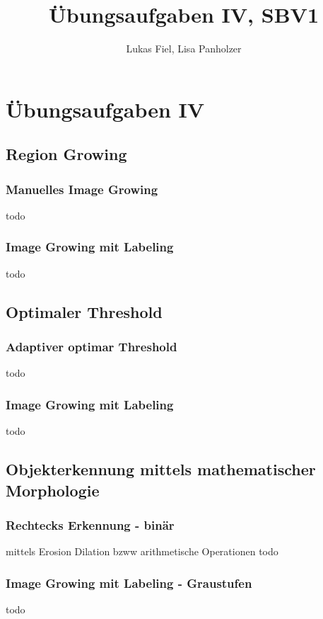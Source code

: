 \documentclass[12pt,german]{article}
\begin{document}
\title{Übungsaufgaben IV, SBV1 }
\author{Lukas Fiel, Lisa Panholzer}
\maketitle


\newpage
\section{Übungsaufgaben IV}
\subsection{Region Growing}

\subsubsection{Manuelles Image Growing}
todo

\subsubsection{Image Growing mit Labeling}
todo


\subsection{Optimaler Threshold}

\subsubsection{Adaptiver optimar Threshold}
todo

\subsubsection{Image Growing mit Labeling}
todo


\subsection{Objekterkennung mittels mathematischer Morphologie}

\subsubsection{Rechtecks Erkennung - binär}
mittels Erosion Dilation
bzww
arithmetische Operationen
todo

\subsubsection{Image Growing mit Labeling - Graustufen}
todo
\end{document}
